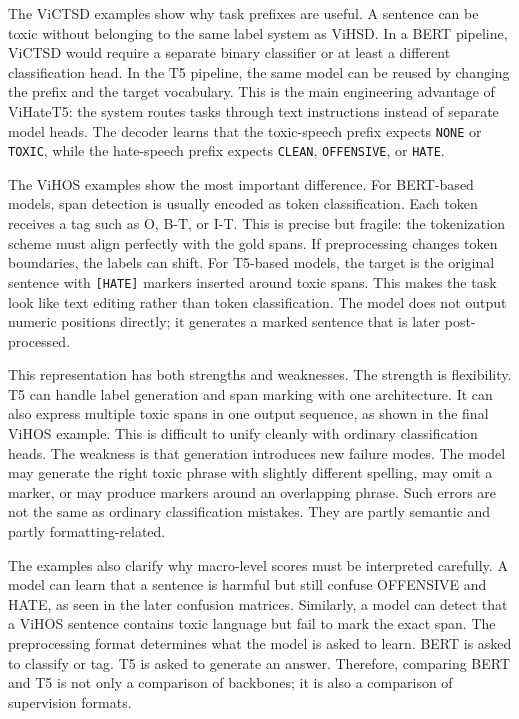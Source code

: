 \documentclass[journal]{IEEEtran}
\begin{document}
The ViCTSD examples show why task prefixes are useful. A sentence can be toxic without belonging to the same label system as ViHSD. In a BERT pipeline, ViCTSD would require a separate binary classifier or at least a different classification head. In the T5 pipeline, the same model can be reused by changing the prefix and the target vocabulary. This is the main engineering advantage of ViHateT5: the system routes tasks through text instructions instead of separate model heads. The decoder learns that the toxic-speech prefix expects \texttt{NONE} or \texttt{TOXIC}, while the hate-speech prefix expects \texttt{CLEAN}, \texttt{OFFENSIVE}, or \texttt{HATE}.

The ViHOS examples show the most important difference. For BERT-based models, span detection is usually encoded as token classification. Each token receives a tag such as O, B-T, or I-T. This is precise but fragile: the tokenization scheme must align perfectly with the gold spans. If preprocessing changes token boundaries, the labels can shift. For T5-based models, the target is the original sentence with \texttt{[HATE]} markers inserted around toxic spans. This makes the task look like text editing rather than token classification. The model does not output numeric positions directly; it generates a marked sentence that is later post-processed.

This representation has both strengths and weaknesses. The strength is flexibility. T5 can handle label generation and span marking with one architecture. It can also express multiple toxic spans in one output sequence, as shown in the final ViHOS example. This is difficult to unify cleanly with ordinary classification heads. The weakness is that generation introduces new failure modes. The model may generate the right toxic phrase with slightly different spelling, may omit a marker, or may produce markers around an overlapping phrase. Such errors are not the same as ordinary classification mistakes. They are partly semantic and partly formatting-related.

The examples also clarify why macro-level scores must be interpreted carefully. A model can learn that a sentence is harmful but still confuse OFFENSIVE and HATE, as seen in the later confusion matrices. Similarly, a model can detect that a ViHOS sentence contains toxic language but fail to mark the exact span. The preprocessing format determines what the model is asked to learn. BERT is asked to classify or tag. T5 is asked to generate an answer. Therefore, comparing BERT and T5 is not only a comparison of backbones; it is also a comparison of supervision formats.
\end{document}

